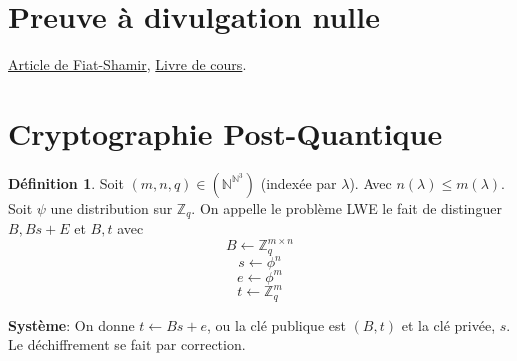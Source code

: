 \documentclass[12pt]{article}
\theoremstyle{plain}
\theoremstyle{definition}
\newtheorem{defn}[subsubsection]{D\'efinition}
\theoremstyle{remark}
\newcommand{\N}{\mathbb{N}}
\newcommand{\Z}{\mathbb{Z}}
\begin{document}
\section{Preuve à divulgation nulle}
\href{http://crypto.cs.mcgill.ca/~crepeau/COMP647/2010/TOPIC03/FFS88.pdf}{Article de Fiat-Shamir},
\href{http://crypto.cs.mcgill.ca/%7Ecrepeau/COMP647/Livre.pdf}{Livre de cours}.

\newpage
\section{Cryptographie Post-Quantique}

\begin{defn}
    Soit $(m,n,q)\in (\N^{\N^3})$ (indexée par $\lambda$).
    Avec $n(\lambda)\leq m(\lambda)$. Soit $\psi$ une 
    distribution sur $\Z_q$. On appelle le problème 
    LWE le fait de distinguer $B,Bs+E$ et $B,t$ avec 
    \[B\leftarrow\Z_q^{m\times n}\]
    \[s\leftarrow\phi^n\]
    \[e\leftarrow \phi^m\]
    \[t\leftarrow \Z_q^m\]
\end{defn}

\textbf{Système}: On donne $t\leftarrow Bs+e$, ou 
la clé publique est $(B,t)$ et la clé privée, $s$. 
Le déchiffrement se fait par correction.
\end{document}
